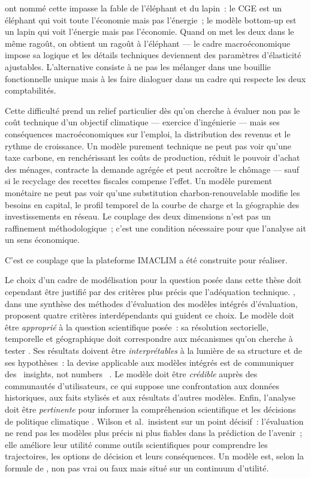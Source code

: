 \textcite{hourcade_hybrid_2006} ont nommé cette impasse la \og fable de l'éléphant et du lapin\fg{}~: le CGE est un éléphant qui voit toute l'économie mais pas l'énergie~; le modèle bottom-up est un lapin qui voit l'énergie mais pas l'économie. Quand on met les deux dans le même ragoût, on obtient un ragoût à l'éléphant --- le cadre macroéconomique impose sa logique et les détails techniques deviennent des paramètres d'élasticité ajustables. L'alternative consiste à ne pas les mélanger dans une bouillie fonctionnelle unique mais à les faire dialoguer dans un cadre qui respecte les deux comptabilités.

Cette difficulté prend un relief particulier dès qu'on cherche à évaluer non pas le coût technique d'un objectif climatique --- exercice d'ingénierie --- mais ses conséquences macroéconomiques sur l'emploi, la distribution des revenus et le rythme de croissance. Un modèle purement technique ne peut pas voir qu'une taxe carbone, en renchérissant les coûts de production, réduit le pouvoir d'achat des ménages, contracte la demande agrégée et peut accroître le chômage --- sauf si le recyclage des recettes fiscales compense l'effet. Un modèle purement monétaire ne peut pas voir qu'une substitution charbon-renouvelable modifie les besoins en capital, le profil temporel de la courbe de charge et la géographie des investissements en réseau. Le couplage des deux dimensions n'est pas un raffinement méthodologique~; c'est une condition nécessaire pour que l'analyse ait un sens économique.

C'est ce couplage que la plateforme IMACLIM a été construite pour réaliser.

Le choix d'un cadre de modélisation pour la question posée dans cette thèse doit cependant être justifié par des critères plus précis que l'adéquation technique. \textcite{wilson_evaluating_2021}, dans une synthèse des méthodes d'évaluation des modèles intégrés d'évaluation, proposent quatre critères interdépendants qui guident ce choix. Le modèle doit être \emph{approprié} à la question scientifique posée~: sa résolution sectorielle, temporelle et géographique doit correspondre aux mécanismes qu'on cherche à tester \parencite{jakeman_ten_2006}. Ses résultats doivent être \emph{interprétables} à la lumière de sa structure et de ses hypothèses~: la devise applicable aux modèles intégrés est de communiquer des \og~insights, not numbers~\fg{} \parencite{peace_insights_2008}. Le modèle doit être \emph{crédible} auprès des communautés d'utilisateurs, ce qui suppose une confrontation aux données historiques, aux faits stylisés et aux résultats d'autres modèles. Enfin, l'analyse doit être \emph{pertinente} pour informer la compréhension scientifique et les décisions de politique climatique \parencite{cash_knowledge_2003}. Wilson et al.\ insistent sur un point décisif~: l'évaluation ne rend pas les modèles plus précis ni plus fiables dans la prédiction de l'avenir~; elle améliore leur utilité comme outils scientifiques pour comprendre les trajectoires, les options de décision et leurs conséquences. Un modèle est, selon la formule de \textcite{barlas_philosophical_1990}, non pas vrai ou faux mais situé sur un continuum d'utilité.

